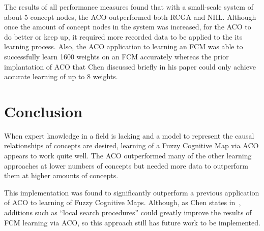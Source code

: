 \documentclass{umm-senior-sem}
\begin{document}
The results of all performance measures found that with a small-scale system of about 5 concept nodes, the ACO outperformed both RCGA and NHL. Although once the amount of concept nodes in the system was increased, for the ACO to do better or keep up, it required more recorded data to be applied to the its learning process. Also, the ACO application to learning an FCM was able to successfully learn 1600 weights on an FCM accurately whereas the prior implantation of ACO that Chen discussed briefly in his paper could only achieve accurate learning of up to 8 weights.
\section{Conclusion}
\label{sec:Conclusion}
When expert knowledge in a field is lacking and a model to represent the causal relationships of concepts are desired, learning of a Fuzzy Cognitive Map via ACO appears to work quite well. The ACO outperformed many of the other learning approaches at lower numbers of concepts but needed more data to outperform them at higher amounts of concepts. 

This implementation was found to significantly outperform a previous application of ACO to learning of Fuzzy Cognitive Maps. Although, as Chen states in~\cite{main:2012}, additions such as ``local search procedures'' could greatly improve the results of FCM learning via ACO, so this approach still has future work to be implemented.

\nocite{*}



\end{document}
